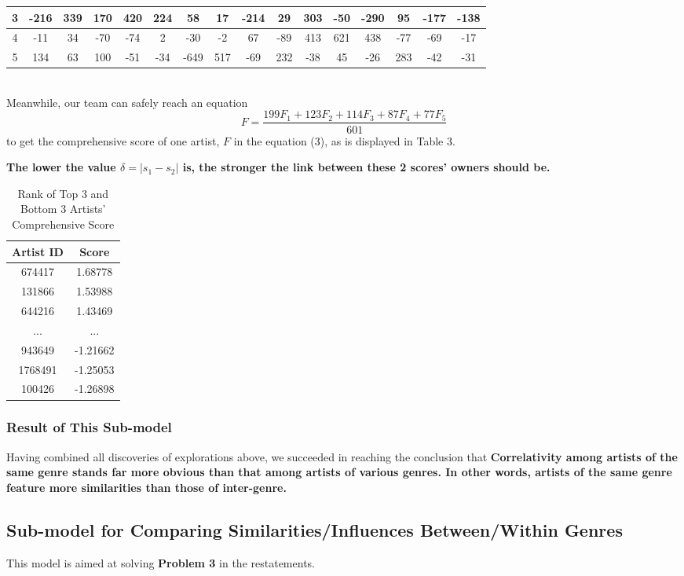 \documentclass[12pt]{article}
\begin{document}
{\begin{table}[htp]
\begin{tabular}{|c||c|c|c|c|c|c|c|c|c|c|c|c|c|c|c|}
	\hline
	3 &-216 &339 &170 &420 &224 &58 &17 &-214 &29 &303 &-50 &-290 &95 &-177 &-138\\
	\hline
	4 &-11 &34 &-70 &-74 &2 &-30 &-2 &67 &-89 &413 &621 &438 &-77 &-69 &-17\\
	\hline
	5 &134 &63 &100 &-51 &-34 &-649 &517 &-69 &232 &-38 &45 &-26 &283 &-42 &-31\\
	\hline
\end{tabular}
\end{table}
\\
Meanwhile, our team can safely reach an equation
\begin{equation}
	F=\frac{199F_1+123F_2+114F_3+87F_4+77F_5}{601}
\end{equation}
to get the comprehensive score of one artist, $F$ in the equation (3), as is displayed in Table 3.\\[2ex]
{\textbf{The lower the value $\delta=|s_1-s_2|$ is, the stronger the link between these 2 scores' owners should be.}
\begin{table}[h]
\centering
\begin{tabular}{|c|c|}
	\hline
	Artist ID &Score\\
	\hline
	674417 & 1.68778\\
	131866 & 1.53988\\
	644216 & 1.43469\\
	... &...\\
	943649 &-1.21662\\
	1768491 &-1.25053\\
	100426 &-1.26898\\
	\hline
	\end{tabular}
	\caption{Rank of Top 3 and Bottom 3 Artists' Comprehensive Score}	
\end{table}
\subsubsection{Result of This Sub-model}
Having combined all discoveries of explorations above, we succeeded in reaching the conclusion that {\textbf{Correlativity among artists of the same genre stands far more obvious than that among artists of various genres. In other words, artists of the same genre feature more similarities than those of inter-genre.}}
\subsection{Sub-model for Comparing Similarities/Influences Between/Within Genres}
This model is aimed at solving \textbf{Problem 3} in the restatements.\\[2ex]
}}
\end{document}
